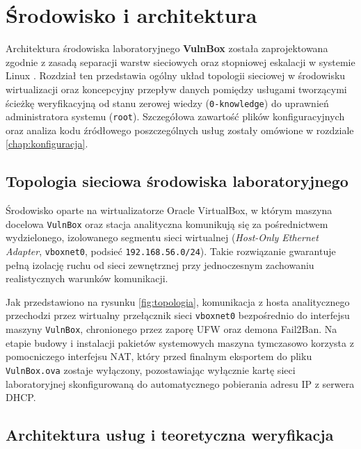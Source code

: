 \chapter{Środowisko i architektura}
\label{chap:architektura}

Architektura środowiska laboratoryjnego \textbf{VulnBox} została zaprojektowana zgodnie z zasadą separacji warstw sieciowych oraz stopniowej eskalacji w systemie Linux \cite{nist800115}. Rozdział ten przedstawia ogólny układ topologii sieciowej w środowisku wirtualizacji oraz koncepcyjny przepływ danych pomiędzy usługami tworzącymi ścieżkę weryfikacyjną od stanu zerowej wiedzy (\texttt{0-knowledge}) do uprawnień administratora systemu (\texttt{root}). Szczegółowa zawartość plików konfiguracyjnych oraz analiza kodu źródłowego poszczególnych usług zostały omówione w rozdziale \ref{chap:konfiguracja}.

\section{Topologia sieciowa środowiska laboratoryjnego}
\label{sec:topologia}

Środowisko oparte na wirtualizatorze Oracle VirtualBox, w którym maszyna docelowa \texttt{VulnBox} oraz stacja analityczna komunikują się za pośrednictwem wydzielonego, izolowanego segmentu sieci wirtualnej (\emph{Host-Only Ethernet Adapter}, \texttt{vboxnet0}, podsieć \texttt{192.168.56.0/24}). Takie rozwiązanie gwarantuje pełną izolację ruchu od sieci zewnętrznej przy jednoczesnym zachowaniu realistycznych warunków komunikacji.


Jak przedstawiono na rysunku \ref{fig:topologia}, komunikacja z hosta analitycznego przechodzi przez wirtualny przełącznik sieci \texttt{vboxnet0} bezpośrednio do interfejsu maszyny \texttt{VulnBox}, chronionego przez zaporę UFW oraz demona Fail2Ban. Na etapie budowy i instalacji pakietów systemowych maszyna tymczasowo korzysta z pomocniczego interfejsu NAT, który przed finalnym eksportem do pliku \texttt{VulnBox.ova} zostaje wyłączony, pozostawiając wyłącznie kartę sieci laboratoryjnej skonfigurowaną do automatycznego pobierania adresu IP z serwera DHCP.

\section{Architektura usług i teoretyczna weryfikacja}
\label{sec:architektura-uslug}

